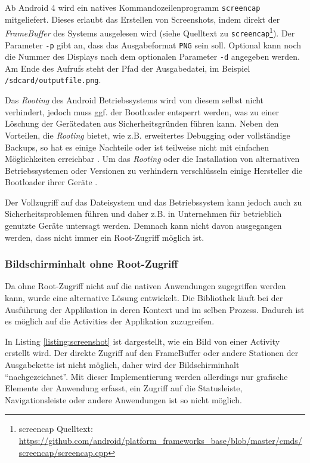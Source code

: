 Ab Android 4 wird ein natives Kommandozeilenprogramm \texttt{screencap} mitgeliefert.
Dieses erlaubt das Erstellen von Screenshots, indem direkt der \emph{FrameBuffer} des Systems ausgelesen wird (siehe Quelltext zu \texttt{screencap}\footnote{screencap Quelltext: \url{https://github.com/android/platform_frameworks_base/blob/master/cmds/screencap/screencap.cpp}}).
Der Parameter \texttt{-p} gibt an, dass das Ausgabeformat \texttt{PNG} sein soll. 
Optional kann noch die Nummer des Displays nach dem optionalen Parameter \texttt{-d} angegeben werden.
Am Ende des Aufrufs steht der Pfad der Ausgabedatei, im Beispiel \texttt{/sdcard/outputfile.png}. 

Das \emph{Rooting} des Android Betriebssystems wird von diesem selbst nicht verhindert, jedoch muss ggf. der Bootloader entsperrt werden, was zu einer Löschung der Gerätedaten aus Sicherheitsgründen führen kann. 
Neben den Vorteilen, die \emph{Rooting} bietet, wie z.B. erweitertes Debugging oder vollständige Backups, so hat es einige Nachteile oder ist teilweise nicht mit einfachen Möglichkeiten erreichbar \cite[vgl.][]{androidsecurity}.
Um das \emph{Rooting} oder die Installation von alternativen Betriebssystemen oder Versionen zu verhindern verschlüsseln einige Hersteller die Bootloader ihrer Geräte \cite[vgl.][6\psq]{androiddataintegrity}.

Der Vollzugriff auf das Dateisystem und das Betriebssystem kann jedoch auch zu Sicherheitsproblemen führen und daher z.B. in Unternehmen für betrieblich genutzte Geräte untersagt werden.
Demnach kann nicht davon ausgegangen werden, dass nicht immer ein Root-Zugriff möglich ist.

\subsubsection{Bildschirminhalt ohne Root-Zugriff}
Da ohne Root-Zugriff nicht auf die nativen Anwendungen zugegriffen werden kann, wurde eine alternative Lösung entwickelt.
Die Bibliothek läuft bei der Ausführung der Applikation in deren Kontext und im selben Prozess.
Dadurch ist es möglich auf die Activities der Applikation zuzugreifen.

In Listing \ref{listing:screenshot} ist dargestellt, wie ein Bild von einer Activity erstellt wird.
Der direkte Zugriff auf den FrameBuffer oder andere Stationen der Ausgabekette ist nicht möglich, daher wird der Bildschirminhalt \enquote{nachgezeichnet}.
Mit dieser Implementierung werden allerdings nur grafische Elemente der Anwendung erfasst, ein Zugriff auf die Statusleiste, Navigationsleiste oder andere Anwendungen ist so nicht möglich.

